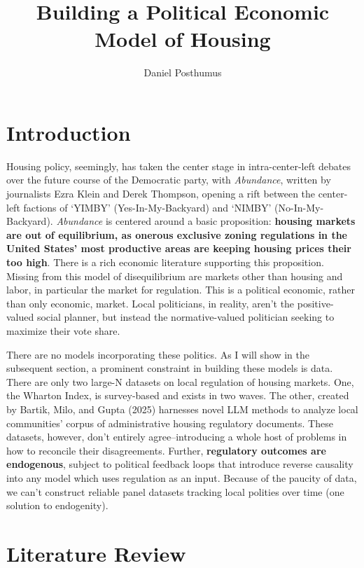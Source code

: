 \documentclass{article}
\title{Building a Political Economic Model of Housing}
\author{Daniel Posthumus}
\begin{document}
\maketitle

\tableofcontents

\section{Introduction}

Housing policy, seemingly, has taken the center stage in intra-center-left debates over the future course of the Democratic party, with \textit{Abundance}, written by journalists Ezra Klein and Derek Thompson, opening a rift between the center-left factions of `YIMBY' (Yes-In-My-Backyard) and `NIMBY' (No-In-My-Backyard). \textit{Abundance} is centered around a basic proposition: \textbf{housing markets are out of equilibrium, as onerous exclusive zoning regulations in the United States' most productive areas are keeping housing prices their too high}. There is a rich economic literature supporting this proposition. Missing from this model of disequilibrium are markets other than housing and labor, in particular the market for regulation. This is a political economic, rather than only economic, market. Local politicians, in reality, aren't the positive-valued social planner, but instead the normative-valued politician seeking to maximize their vote share. 

There are no models incorporating these politics. As I will show in the subsequent section, a prominent constraint in building these models is data. There are only two large-N datasets on local regulation of housing markets. One, the Wharton Index, is survey-based and exists in two waves. The other, created by Bartik, Milo, and Gupta (2025) harnesses novel LLM methods to analyze local communities' corpus of administrative housing regulatory documents. These datasets, however, don't entirely agree--introducing a whole host of problems in how to reconcile their disagreements. Further, \textbf{regulatory outcomes are endogenous}, subject to political feedback loops that introduce reverse causality into any model which uses regulation as an input. Because of the paucity of data, we can't construct reliable panel datasets tracking local polities over time (one solution to endogenity). 

\section{Literature Review}
\end{document}
